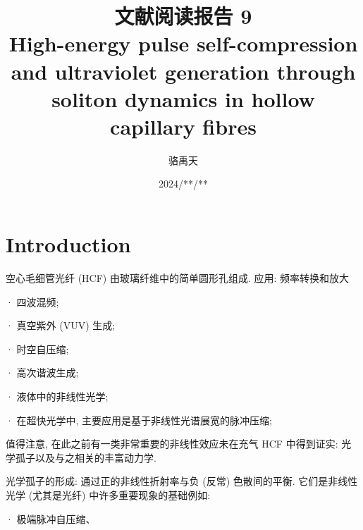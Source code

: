 \documentclass[14pt,a4paper,oneside]{article}
\title{\textbf{文献阅读报告 9\\High-energy pulse self-compression and ultraviolet generation through soliton dynamics in hollow capillary fibres}}                           %
\author{骆禹天}                                           %
\date{2024/**/**}                                        %
\numberwithin{equation}{subsection}             %
\numberwithin{figure}{subsection}               %
\begin{document}

\maketitle

\setcounter{page}{1}          %


\tableofcontents              %

\newpage
\setcounter{page}{1}          %







\section{Introduction}

空心毛细管光纤 (HCF) 由玻璃纤维中的简单圆形孔组成. 应用: 频率转换和放大

· 四波混频\cite{durfeeUltrabroadbandPhasematchedOptical1997, kidaOpticalParametricAmplification2014};

· 真空紫外 (VUV) 生成\cite{misogutiGenerationBroadbandVUV2001};

· 时空自压缩\cite{wagnerSelfCompressionUltrashortPulses2004, andersonHighenergyLaserpulseSelfcompression2014, gaoIonizationassistedSpatiotemporalLocalization2018};

· 高次谐波生成\cite{durfeeiiiPhaseMatchingHighorder1999, popmintchevBrightCoherentUltrahigh2012};

· 液体中的非线性光学\cite{chemnitzHybridSolitonDynamics2017};

· 在超快光学中, 主要应用是基于非线性光谱展宽的脉冲压缩\cite{nisoliGenerationHighEnergy1996, nisoliTerawattscaleSub10fsLaser1998};

值得注意, 在此之前有一类非常重要的非线性效应未在充气 HCF 中得到证实: 光学孤子以及与之相关的丰富动力学. 

光学孤子的形成: 通过正的非线性折射率与负 (反常) 色散间的平衡. 它们是非线性光学 (尤其是光纤) 中许多重要现象的基础例如:

· 极端脉冲自压缩\cite{mollenauerExtremePicosecondPulse1983, imHighpowerSolitoninducedSupercontinuum2010, jolyBrightSpatiallyCoherent2011, makTwoTechniquesTemporal2013, balciunasStrongfieldDriverSinglecycle2015}、
\end{document}
